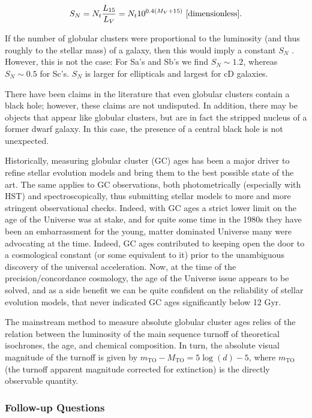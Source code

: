 \documentclass[a4paper,11pt]{article}
\begin{document}
\begin{align*}
    S_N = N_t\frac{L_{15}}{L_V} = N_t10^{0.4(M_V+15)} ~ [{\rm dimensionless}].
\end{align*}

{\noindent}If the number of globular clusters were proportional to the luminosity (and thus roughly to the stellar mass) of a galaxy, then this would imply a constant $S_N$ . However, this is not the case: For Sa's and Sb's we find $S_N\sim1.2$, whereas $S_N\sim0.5$ for Sc's. $S_N$ is larger for ellipticals and largest for cD galaxies.

{\noindent}There have been claims in the literature that even globular clusters contain a black hole; however, these claims are not undisputed. In addition, there may be objects that appear like globular clusters, but are in fact the stripped nucleus of a former dwarf galaxy. In this case, the presence of a central black hole is not unexpected.

{\noindent}Historically, measuring globular cluster (GC) ages has been a major driver to refine stellar evolution models and bring them to the best possible state of the art. The same applies to GC observations, both photometrically (especially with HST) and spectroscopically, thus submitting stellar models to more and more stringent observational checks. Indeed, with GC ages a strict lower limit on the age of the Universe was at stake, and for quite some time in the 1980s they have been an embarrassment for the young, matter dominated Universe many were advocating at the time. Indeed, GC ages contributed to keeping open the door to a cosmological constant (or some equivalent to it) prior to the unambiguous discovery of the universal acceleration. Now, at the time of the precision/concordance cosmology, the age of the Universe issue appears to be solved, and as a side benefit we can be quite confident on the reliability of stellar evolution models, that never indicated GC ages significantly below 12 Gyr.

{\noindent}The mainstream method to measure absolute globular cluster ages relies of the relation between the luminosity of the main sequence turnoff of theoretical isochrones, the age, and chemical composition. In turn, the absolute visual magnitude of the turnoff is given by $m_\mathrm{TO} - M_\mathrm{TO} = 5\log(d)-5$, where $m_\mathrm{TO}$ (the turnoff apparent magnitude corrected for extinction) is the directly observable quantity.


\subsubsection{Follow-up Questions}
\end{document}
